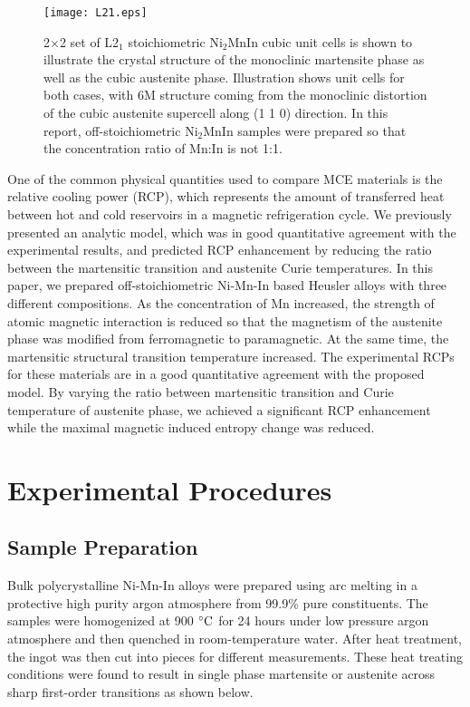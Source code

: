 \documentclass[sort&compress,twocolumn,3p]{elsarticle}
\begin{document}
\begin{figure}
\texttt{[image: L21.eps]}
\caption{2$\times$2 set of L2$_1$ stoichiometric Ni$_2$MnIn cubic unit cells is shown to illustrate the crystal structure of the monoclinic martensite phase as well as the cubic austenite phase.
Illustration shows unit cells for both cases, with 6M structure coming from the monoclinic distortion of the cubic austenite supercell along (1 1 0) direction.
In this report, off-stoichiometric Ni$_2$MnIn samples were prepared so that the concentration ratio of Mn:In is not 1:1.
}
\label{intro}
\end{figure}

One of the common physical quantities used to compare MCE materials is the relative cooling power (RCP),
	which represents the amount of transferred heat between hot and cold reservoirs in a magnetic refrigeration cycle\cite{Pecharsky199944,franco2012magnetocaloric}.
We previously presented an analytic model, which was in good quantitative agreement with the experimental results,
and predicted RCP enhancement by reducing the ratio between the martensitic transition and austenite Curie temperatures\cite{:/content/aip/journal/jap/116/20/10.1063/1.4902527}.
In this paper, we prepared off-stoichiometric Ni-Mn-In based Heusler alloys with three different compositions.
As the concentration of Mn increased, the strength of atomic magnetic interaction is reduced so that the magnetism of the austenite phase was modified from ferromagnetic to paramagnetic.
At the same time, the martensitic structural transition temperature increased.
The experimental RCPs for these materials are in a good quantitative agreement with the proposed model.
By varying the ratio between martensitic transition and Curie temperature of austenite phase,
   we achieved a significant RCP enhancement while the maximal magnetic induced entropy change was reduced.

\section{Experimental Procedures}
\subsection{Sample Preparation}
Bulk polycrystalline Ni-Mn-In alloys were prepared using arc melting in a protective high purity argon atmosphere from 99.9\% pure constituents.
The samples were homogenized at 900 $\celsius$ for 24 hours under low pressure argon atmosphere and then quenched in room-temperature water.
After heat treatment, the ingot was then cut into pieces for different measurements.
These heat treating conditions were found to result in single phase martensite or austenite across sharp first-order transitions as shown below.
\end{document}
